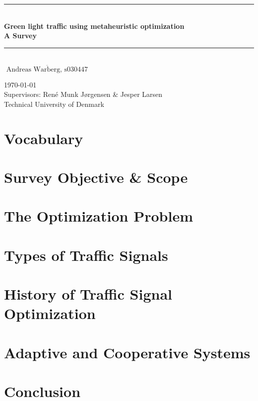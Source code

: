 \documentclass [a4paper, 11pt, titlepage] {article}
\date{A date}
\begin{document}
\setlength{\parindent}{4mm}

\begin{titlepage}
  \begin{center}
    \noindent\rule{\linewidth}{1mm}\\[4mm]
      {\sffamily\bfseries \Huge Green light traffic using metaheuristic optimization}\\[1mm]
      {\sffamily\bfseries \Large
        A Survey}\\[0mm]
    \noindent\rule{\linewidth}{1mm}\\[30mm]
    \large $\overline{\textrm{ Andreas Warberg, s030447 }}$


    \large \today \\[6mm]
    Supervisors: Ren\'{e} Munk Jørgensen \& Jesper Larsen \\[3mm]
    Technical University of Denmark
  \end{center}
\end{titlepage}

\newpage
{}
\tableofcontents
\newpage
{}



\newpage

\section{Vocabulary}


\section{Survey Objective \& Scope}


\section{The Optimization Problem}


\section{Types of Traffic Signals}


\section{History of Traffic Signal Optimization}


\section{Adaptive and Cooperative Systems}


\clearpage
\pagebreak

\section{Conclusion}


\clearpage
\newpage




\clearpage
\newpage
\appendix
\end{document}

